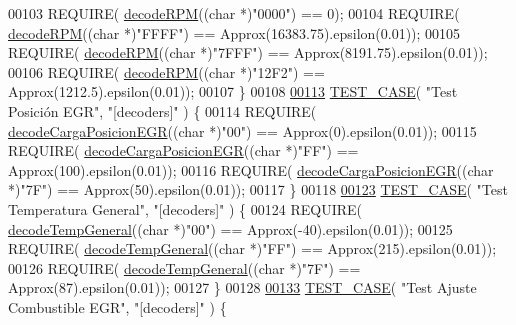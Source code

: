 \begin{DoxyCode}
{00103     REQUIRE( \hyperlink{decoders_8cpp_a889868c7b1e554aee496e6aed7101cc4}{decodeRPM}((\textcolor{keywordtype}{char} *)\textcolor{stringliteral}{"0000"}) == 0);
00104     REQUIRE( \hyperlink{decoders_8cpp_a889868c7b1e554aee496e6aed7101cc4}{decodeRPM}((\textcolor{keywordtype}{char} *)\textcolor{stringliteral}{"FFFF"}) == Approx(16383.75).epsilon(0.01));
00105     REQUIRE( \hyperlink{decoders_8cpp_a889868c7b1e554aee496e6aed7101cc4}{decodeRPM}((\textcolor{keywordtype}{char} *)\textcolor{stringliteral}{"7FFF"}) == Approx(8191.75).epsilon(0.01));
00106     REQUIRE( \hyperlink{decoders_8cpp_a889868c7b1e554aee496e6aed7101cc4}{decodeRPM}((\textcolor{keywordtype}{char} *)\textcolor{stringliteral}{"12F2"}) == Approx(1212.5).epsilon(0.01));
00107 \}
00108 
\hyperlink{UnitTestCase_8cpp_a6de3b92394355f7de997d66ffda41110}{00113} \hyperlink{UnitTestCase_8cpp_a094ceea8956a9b495823bde621ea759a}{TEST\_CASE}( \textcolor{stringliteral}{"Test Posición EGR"}, \textcolor{stringliteral}{"[decoders]"} ) \{
00114     REQUIRE( \hyperlink{decoders_8cpp_adbe68794075963c37e654d53b8a46f68}{decodeCargaPosicionEGR}((\textcolor{keywordtype}{char} *)\textcolor{stringliteral}{"00"}) == Approx(0).epsilon(0.01));
00115     REQUIRE( \hyperlink{decoders_8cpp_adbe68794075963c37e654d53b8a46f68}{decodeCargaPosicionEGR}((\textcolor{keywordtype}{char} *)\textcolor{stringliteral}{"FF"}) == Approx(100).epsilon(0.01));
00116     REQUIRE( \hyperlink{decoders_8cpp_adbe68794075963c37e654d53b8a46f68}{decodeCargaPosicionEGR}((\textcolor{keywordtype}{char} *)\textcolor{stringliteral}{"7F"}) == Approx(50).epsilon(0.01));
00117 \}
00118 
\hyperlink{UnitTestCase_8cpp_a376ac0e4b8eef0360ec825760e4b6b15}{00123} \hyperlink{UnitTestCase_8cpp_a094ceea8956a9b495823bde621ea759a}{TEST\_CASE}( \textcolor{stringliteral}{"Test Temperatura General"}, \textcolor{stringliteral}{"[decoders]"} ) \{
00124     REQUIRE( \hyperlink{decoders_8cpp_af581438645d7ff67766fa2e5eba5eaf9}{decodeTempGeneral}((\textcolor{keywordtype}{char} *)\textcolor{stringliteral}{"00"}) == Approx(-40).epsilon(0.01));
00125     REQUIRE( \hyperlink{decoders_8cpp_af581438645d7ff67766fa2e5eba5eaf9}{decodeTempGeneral}((\textcolor{keywordtype}{char} *)\textcolor{stringliteral}{"FF"}) == Approx(215).epsilon(0.01));
00126     REQUIRE( \hyperlink{decoders_8cpp_af581438645d7ff67766fa2e5eba5eaf9}{decodeTempGeneral}((\textcolor{keywordtype}{char} *)\textcolor{stringliteral}{"7F"}) == Approx(87).epsilon(0.01));
00127 \}
00128 
\hyperlink{UnitTestCase_8cpp_afd7d9244b2b8c27b86ea397d397a6cf6}{00133} \hyperlink{UnitTestCase_8cpp_a094ceea8956a9b495823bde621ea759a}{TEST\_CASE}( \textcolor{stringliteral}{"Test Ajuste Combustible EGR"}, \textcolor{stringliteral}{"[decoders]"} ) \{
}
\end{DoxyCode}
